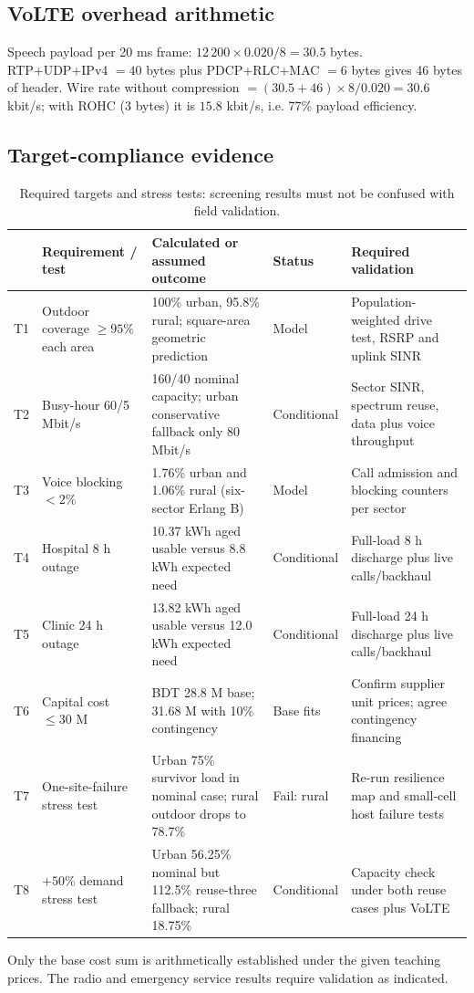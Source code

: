 \documentclass[9pt,a4paper]{extarticle}
\begin{document}
\subsection{VoLTE overhead arithmetic}
Speech payload per 20 ms frame: $12\,200\times0.020/8 = 30.5$ bytes. RTP+UDP+IPv4 $=40$ bytes
plus PDCP+RLC+MAC $=6$ bytes gives 46 bytes of header. Wire rate without compression
$=(30.5+46)\times8/0.020=30.6$ kbit/s; with ROHC (3 bytes) it is $15.8$ kbit/s, i.e. 77\% payload
efficiency.

\subsection{Target-compliance evidence}
\begin{table}[H]\centering\scriptsize
\caption{Required targets and stress tests: screening results must not be confused with field validation.}
\label{tab:compliance}
\begin{tabularx}{\textwidth}{@{}p{0.55cm}p{3.0cm}Xp{1.55cm}p{4.5cm}@{}}\toprule
& \textbf{Requirement / test} & \textbf{Calculated or assumed outcome} & \textbf{Status} & \textbf{Required validation} \\ \midrule
T1 & Outdoor coverage $\geq95\%$ each area & 100\% urban, 95.8\% rural; square-area geometric prediction & Model & Population-weighted drive test, RSRP and uplink SINR \\
T2 & Busy-hour 60/5 Mbit/s & 160/40 nominal capacity; urban conservative fallback only 80 Mbit/s & Conditional & Sector SINR, spectrum reuse, data plus voice throughput \\
T3 & Voice blocking $<2\%$ & 1.76\% urban and 1.06\% rural (six-sector Erlang B) & Model & Call admission and blocking counters per sector \\
T4 & Hospital 8 h outage & 10.37 kWh aged usable versus 8.8 kWh expected need & Conditional & Full-load 8 h discharge plus live calls/backhaul \\
T5 & Clinic 24 h outage & 13.82 kWh aged usable versus 12.0 kWh expected need & Conditional & Full-load 24 h discharge plus live calls/backhaul \\
T6 & Capital cost $\leq30$ M & BDT 28.8 M base; 31.68 M with 10\% contingency & Base fits & Confirm supplier unit prices; agree contingency financing \\
T7 & One-site-failure stress test & Urban 75\% survivor load in nominal case; rural outdoor drops to 78.7\% & Fail: rural & Re-run resilience map and small-cell host failure tests \\
T8 & $+50\%$ demand stress test & Urban 56.25\% nominal but 112.5\% reuse-three fallback; rural 18.75\% & Conditional & Capacity check under both reuse cases plus VoLTE \\ \bottomrule
\end{tabularx}
\end{table}
Only the base cost sum is arithmetically established under the given teaching
prices. The radio and emergency service results require validation as indicated.
\end{document}
